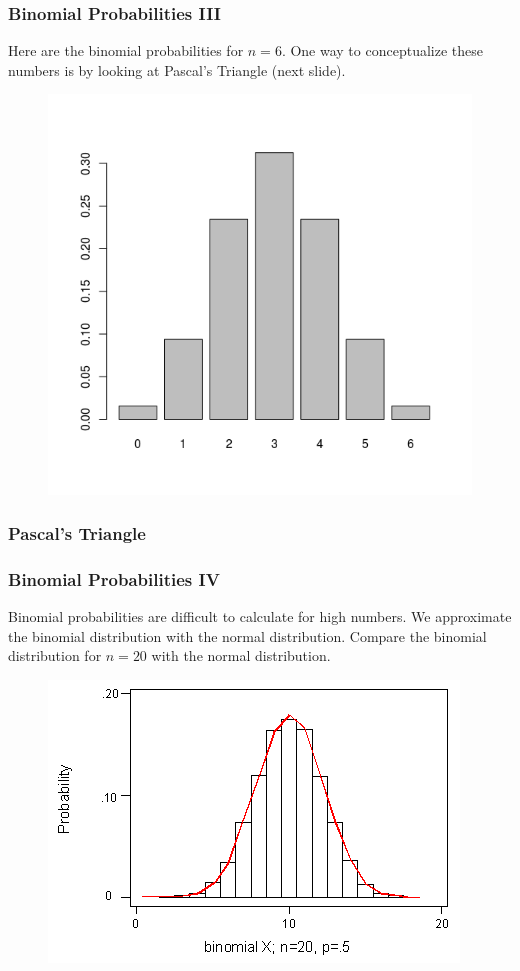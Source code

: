 \documentclass[xcolor=dvipsnames]{beamer}
\begin{document}
\begin{frame}
  \frametitle{Binomial Probabilities III}
Here are the binomial probabilities for $n=6$. One way to
conceptualize these numbers is by looking at Pascal's Triangle (next
slide). 
  \begin{figure}[h]
    \includegraphics[scale=.5]{./binomial1.png}
  \end{figure}
\end{frame}

\begin{frame}
  \frametitle{Pascal's Triangle}
\end{frame}

\begin{frame}
  \frametitle{Binomial Probabilities IV}
Binomial probabilities are difficult to calculate for high numbers. We
approximate the binomial distribution with the \alert{normal distribution}.
Compare the binomial distribution for $n=20$ with the normal
distribution.
  \begin{figure}[h]
    \includegraphics[scale=.5]{./binnorm.png}
  \end{figure}
\end{frame}
\end{document}
